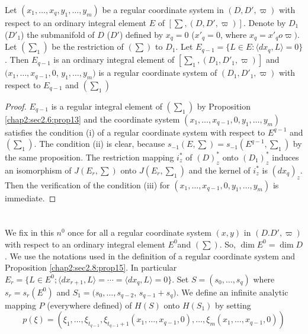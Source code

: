 \begin{proposition}\label{chap2:sec2.8:prop15} %
  Let $(x_1,  \ldots ,  x_q ,  y_1 ,  \ldots ,  y_m)$ be a regular
  coordinate system in $(D,  D',  \varpi)$ with respect to an ordinary
  integral element $E$ of $\left [\sum,  (D,  D',  \varpi) \right
  ]$. Denote by $D_1 $ (\resp  $D'_1$) the submanifold of $D$
  (\resp\break  $D'$) defined by $x_q = 0$ (\resp  $x'_q = 0$,  where $x_q =
  x'_q o \varpi)$. Let $(\sum_1)$ be the restriction of $(\sum)$ to
  $D_1$. Let $E_{q-1} = \big \{L \in E : \langle dx_q ,  L \rangle = 0
  \big \}$. Then $E_{q-1}$ is an ordinary integral element of $\left
       [\sum_1,  (D_1,  D'_1,  \varpi) \right ]$ and $(x_1,  \ldots ,
       x_{q-1},  0$,  $y_1 ,  \ldots ,  y_m)$ is a regular coordinate
       system of $(D_1,  D'_1,  \varpi)$ with respect to $E_{q-1}$ and
       $(\sum_1)$  
\end{proposition} 

\begin{proof}
  $E_{q-1}$ is a regular integral element of $(\sum_1)$ by Proposition
  \ref{chap2:sec2.6:prop13} and the coordinate system $(x_1,  \ldots ,  x_{q-1} ,  0 ,  y_1
  ,  \ldots ,  y_m)$ satisfies the condition (i) of a regular
  coordinate system with respect to $E^{q-1}$ and $(\sum_1)$. The
  condition (ii) is clear,  because $s_{-1} (E,  \sum) = s_{-1}
  (E^{q-1},  \sum_1)$ by the same proposition. The restriction mapping
  $i^*_z$ of $(D)^*_z$ onto $(D_1)^*_z$ induces an isomorphism of $J
  (E_r,  \sum)$ onto $J (E_r,  \sum_1)$ and the kernel of $i^*_z$ is
  $(dx_q)_z$. Then the verification of the condition (iii) for
  $(x_1,  \ldots ,  x_{q-1} , 0 ,  y_1 ,  \ldots ,  y_m)$ is
  immediate. 
\end{proof} 

\section{}\label{chap2:sec2.9} %

We fix in this $n^0$ once for all a regular coordinate system $(x,
y)$ in \break $(D. D',  \varpi)$ with respect to an ordinary integral
element  $E^0$\pageoriginale and $(\sum)$. So,  $\dim E^0 = \dim D$. We use the
notations used in the definition of a regular coordinate system and
Proposition \ref{chap2:sec2.8:prop15}. In particular $E_r = \{L \in E^0 ; \langle dx_{r+1},
L \rangle = \cdots = \langle dx_q,  L \rangle = 0 \}$. Set $S = (s_0,
\ldots ,  s_q)$ where $s_r = s_r (E^0)$ and $S_1 = (s_0,  \ldots ,
s_{q-2}$,  $s_{q-1} + s_q)$. We define an infinite analytic mapping
$P$ (everywhere defined) of $H(S)$ onto $H(S_1)$ by setting 
$$
p (\xi ) = (\xi_1,  \ldots ,  \xi_{t_{q-1}},  \xi_{t_{q-1}+1} (x_1 ,
\ldots ,  x_{q-1},  0),  \ldots ,  \xi_m (x_1,  \ldots ,  x_{q-1},
0)) 
$$
 

